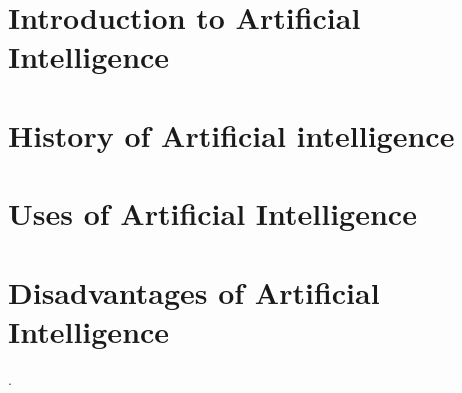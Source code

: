 \documentclass{article}
\begin{document}
 

 
   {\Large \bf {}  }
\section{ Introduction to Artificial Intelligence
}


\section{History of Artificial intelligence}
\section{Uses of Artificial Intelligence
}
\section{Disadvantages of Artificial Intelligence}

.\par

\newpage


\renewcommand*{\thesection}{\Roman{section}}

\noindent\LARGE\bf{}\par\smallskip
\end{document}
